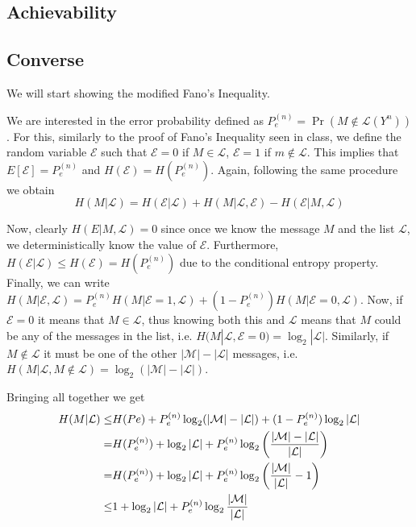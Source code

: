 
\subsection{Achievability}


\subsection{Converse}
We will start showing the modified Fano's Inequality.

We are interested in the error probability defined as $P_e^{(n)} = \Pr(M \notin \mathcal{L}(Y^n))$. For this, similarly to the proof of Fano's Inequality seen in class, we define the random variable $\mathcal{E}$ such that $\mathcal{E}=0$ if $M \in \mathcal{L}$, $\mathcal{E}=1$ if $m \notin \mathcal{L}$. This implies that $E[\mathcal{E}] = P_e^{(n)}$ and $H(\mathcal{E}) = H(P_e^{(n)})$. Again, following the same procedure we obtain
%
\begin{equation}
H(M|\mathcal{L}) = H(\mathcal{E}|\mathcal{L})
+H(M|\mathcal{L},\mathcal{E})
-H(\mathcal{E}|M,\mathcal{L})
\end{equation}

Now, clearly $H(E|M,\mathcal{L})=0$ since once we know the message $M$ and the list $\mathcal{L}$, we deterministically know the value of $\mathcal{E}$. Furthermore, $H(\mathcal{E}|\mathcal{L}) \leq H(\mathcal{E}) = H(P_e^{(n)})$ due to the conditional entropy property. Finally, we can write $H(M|\mathcal{E},\mathcal{L}) = P_e^{(n)} H(M|\mathcal{E}=1,\mathcal{L}) + (1-P_e^{(n)})H(M|\mathcal{E}=0,\mathcal{L})$. Now, if $\mathcal{E}=0$ it means that $M \in \mathcal{L}$, thus knowing both this and $\mathcal{L}$ means that $M$ could be any of the messages in the list, i.e. $H(M|\mathcal{L},\mathcal{E}=0) = \log_2|\mathcal{L}|$. Similarly, if $M \notin \mathcal{L}$ it must be one of the other $|\mathcal{M}|-|\mathcal{L}|$ messages, i.e. $H(M|\mathcal{L},M\notin \mathcal{L})=\log_2(|\mathcal{M}|-|\mathcal{L}|)$.

Bringing all together we get
%
\begin{align}
\begin{split}
H(M|\mathcal{L}) \leq & H(Pe) + P_e^{(n)}\log_2(|\mathcal{M}|-|\mathcal{L}|) + (1-P_e^{(n)})\log_2|\mathcal{L}|\\
=& H(P_e^{(n)}) + \log_2|\mathcal{L}| + P_e^{(n)}\log_2\qty(\frac{|\mathcal{M}|-|\mathcal{L}|}{|\mathcal{L}|})\\
=& H(P_e^{(n)}) + \log_2|\mathcal{L}| + P_e^{(n)}\log_2\qty(\frac{|\mathcal{M}|}{|\mathcal{L}|} - 1)\\
\leq& 1 + \log_2|\mathcal{L}| + P_e^{(n)}\log_2\frac{|\mathcal{M}|}{|\mathcal{L}|}
\end{split}
\end{align}

